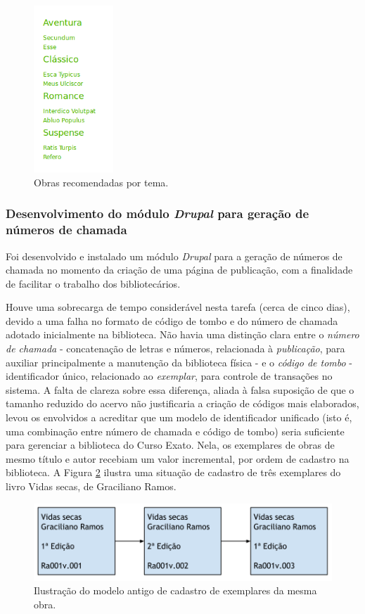 \documentclass[a4paper]{article}
\begin{document}
\begin{figure}[pbth!]
\centering
\includegraphics[width=30mm]{img/leftsidebar-close.png}
\caption{Obras recomendadas por tema.\label{recommended}}
\end{figure}

\subsubsection{Desenvolvimento do módulo \textit{Drupal} para geração de números de chamada}

Foi desenvolvido e instalado um módulo \textit{Drupal} para a geração de números de chamada no momento da criação de uma página de publicação, com a finalidade de facilitar o trabalho dos bibliotecários.

Houve uma sobrecarga de tempo considerável nesta tarefa (cerca de cinco dias), devido a uma falha no formato de código de tombo e do número de chamada adotado inicialmente na biblioteca. Não havia uma distinção clara entre o \textit{número de chamada} - concatenação de letras e números, relacionada à \textit{publicação}, para auxiliar principalmente a manutenção da biblioteca física - e o \textit{código de tombo} - identificador único, relacionado ao \textit{exemplar}, para controle de transações no sistema. A falta de clareza sobre essa diferença, aliada à falsa suposição de que o tamanho reduzido do acervo não justificaria a criação de códigos mais elaborados, levou os envolvidos a acreditar que um modelo de identificador unificado (isto é, uma combinação entre número de chamada e código de tombo) seria suficiente para gerenciar a biblioteca do Curso Exato. Nela, os exemplares de obras de mesmo título e autor recebiam um valor incremental, por ordem de cadastro na biblioteca. A Figura \ref{tombo-antigo} ilustra uma situação de cadastro de três exemplares do livro Vidas secas, de Graciliano Ramos.

\begin{figure}[pbth!]
\centering
\includegraphics[width=120mm]{img/tombo-antigo.png}
\caption{Ilustração do modelo antigo de cadastro de exemplares da mesma obra.\label{tombo-antigo}}
\end{figure}
\end{document}
